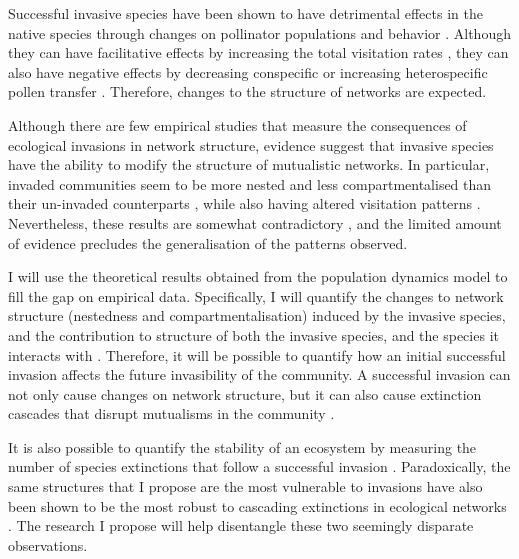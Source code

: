 \documentclass[a4paper]{article}
\begin{document}
Successful invasive species have been shown to have detrimental effects in the native species through changes on pollinator populations and behavior \autocite{Christian2001, Bjerknes2007, Morales2009, Vila2009}.
Although they can have facilitative effects by increasing the total visitation rates \autocite{Bjerknes2007, Sargent2008}, they can also have negative effects by decreasing conspecific or increasing heterospecific pollen transfer \autocite{Morales2009}.
Therefore, changes to the structure of networks are expected.

Although there are few empirical studies that measure the consequences of ecological invasions in network structure, evidence suggest that invasive species have the ability to modify the structure of mutualistic networks.
In particular, invaded communities seem to be more nested \autocite{Bartomeus2008, Stouffer2014} and less compartmentalised \autocite{Albrecht2014} than their un-invaded counterparts , while also having altered visitation patterns \autocite{Vila2009}.
Nevertheless, these results are somewhat contradictory \autocite{Gilberto2012}, and the limited amount of evidence precludes the generalisation of the patterns observed.

I will use the theoretical results obtained from the population dynamics model to fill the gap on empirical data.
Specifically, I will quantify the changes to network structure (nestedness and compartmentalisation) induced by the invasive species, and the contribution to structure of both the invasive species, and the species it interacts with \autocite{Saavedra2011, Stouffer2014}.
Therefore, it will be possible to quantify how an initial successful invasion affects the future invasibility of the community.
A successful invasion can not only cause changes on network structure, but it can also cause extinction cascades that disrupt mutualisms in the community \autocite{Christian2001, RodriguezCabal2013}.

It is also possible to quantify the stability of an ecosystem by measuring the number of species extinctions that follow a successful invasion \autocite{Post1983, Ives2007}.
Paradoxically, the same structures that I propose are the most vulnerable to invasions have also been shown to be the most robust to cascading extinctions in ecological networks \autocite{Tylianakis2010, Stouffer2011, Albrecht2014}.
The research I propose will help disentangle these two seemingly disparate observations.
\end{document}
